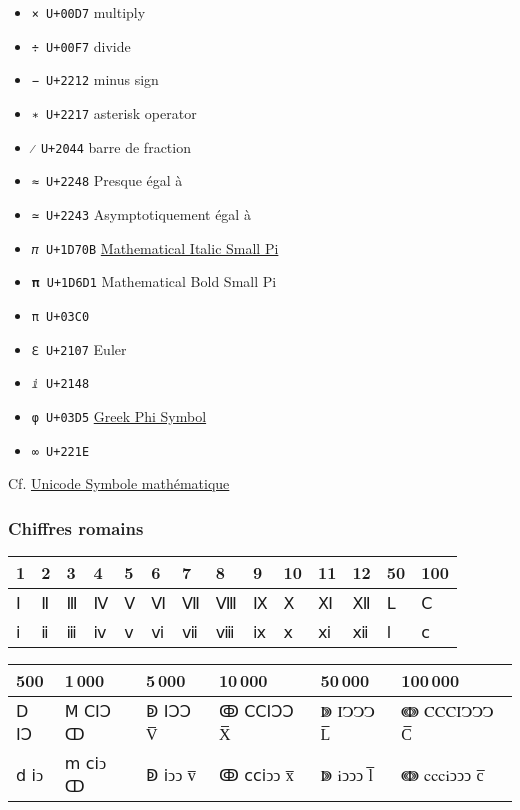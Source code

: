 \documentclass[
  a4paper,
]{book}
\providecommand{\tightlist}{%
  \setlength{\itemsep}{0pt}\setlength{\parskip}{0pt}}
\begin{document}
\begin{itemize}
\tightlist
\item
  \texttt{×\ U+00D7} multiply
\item
  \texttt{÷\ U+00F7} divide
\item
  \texttt{−\ U+2212} minus sign
\item
  \texttt{∗\ U+2217} asterisk operator
\item
  \texttt{⁄\ U+2044} barre de fraction
\item
  \texttt{≈\ U+2248} Presque égal à
\item
  \texttt{≃\ U+2243} Asymptotiquement égal à
\item
  \texttt{𝜋\ U+1D70B} \href{https://en.wikipedia.org/wiki/Pi_(letter)}{Mathematical Italic Small Pi}
\item
  \texttt{𝛑\ U+1D6D1} Mathematical Bold Small Pi
\item
  \texttt{π\ U+03C0}
\item
  \texttt{ℇ\ U+2107} Euler
\item
  \texttt{ⅈ\ U+2148}
\item
  \texttt{φ\ U+03D5} \href{https://en.wikipedia.org/wiki/Phi}{Greek Phi Symbol}
\item
  \texttt{∞\ U+221E}
\end{itemize}

Cf. \href{https://www.compart.com/fr/unicode/category/Sm}{Unicode Symbole mathématique}

\hypertarget{chiffres-romains}{%
\subsubsection{Chiffres romains}\label{chiffres-romains}}

\begin{longtable}[]{@{}llllllllllllll@{}}
\toprule()
1 & 2 & 3 & 4 & 5 & 6 & 7 & 8 & 9 & 10 & 11 & 12 & 50 & 100 \\
\midrule()
\endhead
Ⅰ & Ⅱ & Ⅲ & Ⅳ & Ⅴ & Ⅵ & Ⅶ & Ⅷ & Ⅸ & Ⅹ & Ⅺ & Ⅻ & Ⅼ & Ⅽ \\
ⅰ & ⅱ & ⅲ & ⅳ & ⅴ & ⅵ & ⅶ & ⅷ & ⅸ & ⅹ & ⅺ & ⅻ & ⅼ & ⅽ \\
\bottomrule()
\end{longtable}

\begin{longtable}[]{@{}llllll@{}}
\toprule()
500 & 1\,000 & 5\,000 & 10\,000 & 50\,000 & 100\,000 \\
\midrule()
\endhead
Ⅾ ⅠↃ & Ⅿ ⅭⅠↃ ↀ & ↁ ⅠↃↃ V̅ & ↂ ⅭⅭⅠↃↃ X̅ & ↇ ⅠↃↃↃ L̅ & ↈ ⅭⅭⅭⅠↃↃↃ C̅ \\
ⅾ ⅰↄ & ⅿ ⅽⅰↄ ↀ & ↁ ⅰↄↄ v̅ & ↂ ⅽⅽⅰↄↄ x̅ & ↇ ⅰↄↄↄ l̅ & ↈ ⅽⅽⅽⅰↄↄↄ c̅ \\
\bottomrule()
\end{longtable}
\end{document}
